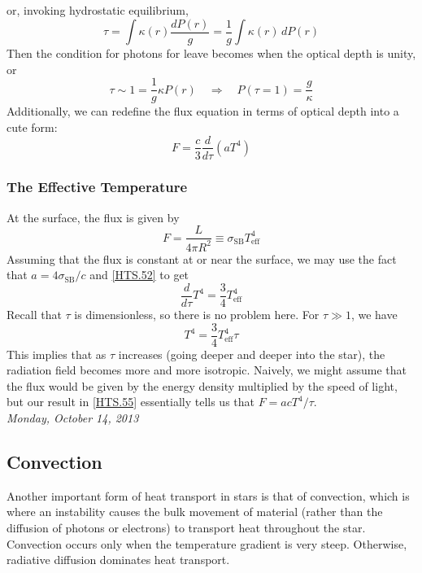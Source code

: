 \documentclass[10pt]{article}
\numberwithin{equation}{section}
\newcommand{\n}{\noindent}
\begin{document}
	or, invoking hydrostatic equilibrium,
	\begin{equation}
		\label{HTS.50} \tau=\int \kappa(r)\frac{dP(r)}{g}=\frac{1}{g}\int 
\kappa(r)\,dP(r)
	\end{equation}
	Then the condition for photons for leave becomes when the optical depth 
is unity, or
	\begin{equation}
		\label{HTS.51} \tau\sim1=\frac{1}{g}\kappa P(r)\quad\Rightarrow
\quad P(\tau=1)=\frac{g}{\kappa}
	\end{equation}
	Additionally, we can redefine the flux equation in terms of optical 
depth into a cute form:
	\begin{equation}
		\label{HTS.52} F=\frac{c}{3}\frac{d}{d\tau}\left(aT^4\right)
	\end{equation}
	\subsubsection{The Effective Temperature}
	At the surface, the flux is given by
	\begin{equation}
		\label{HTS.53} F=\frac{L}{4\pi R^2}\equiv \sigma_{\mathrm{SB}}T_
{\mathrm{eff}}^4
	\end{equation}
	Assuming that the flux is constant at or near the surface, we may use 
the fact that $a=4\sigma_{\mathrm{SB}}/c$ and \eqref{HTS.52} to get
	\begin{equation}
		\label{HTS.54} \frac{d}{d\tau}T^4=\frac{3}{4}T_{\mathrm{eff}}^4
	\end{equation}
	Recall that $\tau$ is dimensionless, so there is no problem here. For $
\tau\gg 1$, we have
	\begin{equation}
		\label{HTS.55} T^4=\frac{3}{4}T_{\mathrm{eff}}^4\tau
	\end{equation}
	This implies that as $\tau$ increases (going deeper and deeper
        into the star), the radiation field becomes more and more
        isotropic. Naively, we might assume that the flux would be
        given by the energy density multiplied by the speed of light,
        but our result in \eqref{HTS.55} essentially tells us that
        $F=acT^4/\tau$.\\

        \n \textit{Monday, October 14, 2013}
\subsection{Convection}
\label{sec:conv}
Another important form of heat transport in stars is that of
convection, which is where an instability causes the bulk movement of
material (rather than the diffusion of photons or electrons) to
transport heat throughout the star. Convection occurs only when the
temperature gradient is very steep. Otherwise, radiative diffusion
dominates heat transport.\\
\end{document}
